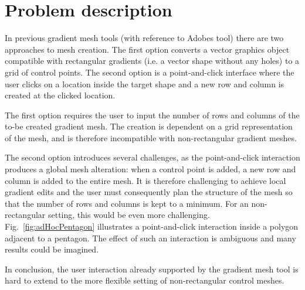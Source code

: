 \documentclass{egpubl}
\begin{document}
	\section{Problem description}
	\label{sec:overview}
	
	In previous gradient mesh tools (with reference to Adobes tool)  there are two approaches to mesh creation. The first option converts a vector graphics object compatible with rectangular gradients (i.e. a vector shape without any holes) to a grid of control points. The second option is a point-and-click interface where the user clicks on a location inside the target shape and a new row and column is created at the clicked location.
	
	The first option requires the user to input the number of rows and columns of the to-be created gradient mesh. The creation is dependent on a grid representation of the mesh, and is therefore incompatible with non-rectangular gradient meshes.
	
	The second option introduces several challenges, as the point-and-click interaction produces a  global mesh alteration: when a control point is added, a new row and column is added to the entire mesh. It is therefore challenging to achieve local gradient edits and the user must consequently plan the structure of the mesh so that the number of rows and columns is kept to a minimum. For an non-rectangular setting, this would be even more challenging. Fig.~\ref{fig:adHocPentagon} illustrates a point-and-click interaction inside a polygon adjacent to a pentagon. The effect of such an interaction is ambiguous and many results could be imagined.
	
	In conclusion, the user interaction already supported by the gradient mesh tool is hard to extend to the more flexible setting of non-rectangular control meshes.
	
\end{document}
